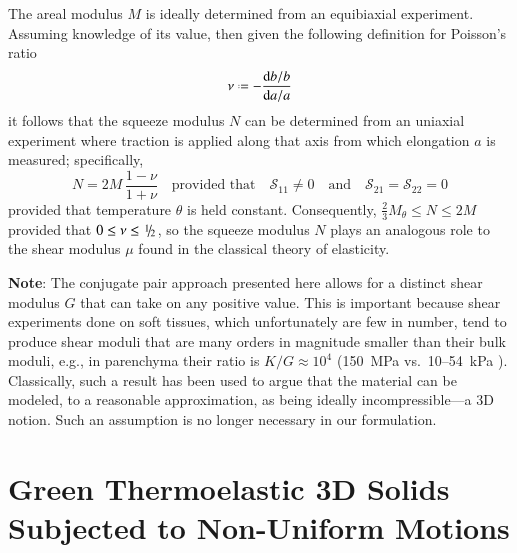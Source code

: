 The areal modulus $M$ is ideally determined from an equibiaxial experiment.  Assuming knowledge of its value, then given the following definition for Poisson's ratio
\begin{displaymath}
\nu \defeq - \frac{\mathrm{d}b / b}{\mathrm{d}a / a}
\end{displaymath}
it follows that the squeeze modulus $N$ can be determined from an uniaxial experiment where traction is applied along that axis from which elongation $a$ is measured; specifically,
\begin{displaymath}
N = 2M \, \frac{1 - \nu}{1 + \nu} 
\quad \text{provided that} \quad
\mathcal{S}_{11} \neq 0 
\quad \text{and} \quad
\mathcal{S}_{21} = \mathcal{S}_{22} = 0 
\end{displaymath}
provided that temperature $\theta$ is held constant.  Consequently, $\tfrac{2}{3} M_{\theta} \leq N \leq 2M$ provided that $0 \leq \nu \leq \textfrac{1}{2}$, so the squeeze modulus $N$ plays an analogous role to the shear modulus $\mu$ found in the classical theory of elasticity.  

\medskip\noindent
\textbf{Note}: 
The conjugate pair approach presented here allows for a distinct shear modulus $G$ that can take on any positive value.  This is important because shear experiments done on soft tissues, which unfortunately are few in number, tend to produce shear moduli that are many orders in magnitude smaller than their bulk moduli, e.g., in parenchyma their ratio is $K/G \approx 10^{4}$ (150~MPa vs.\ 10--54~kPa \cite{Sarafetal07}).  Classically, such a result has been used to argue that the material can be modeled, to a reasonable approximation, as being ideally incompressible---a 3D notion.  Such an assumption is no longer necessary in our formulation.

\section{Green Thermoelastic 3D Solids Subjected to Non-Uniform Motions}
\label{secNonuniform3D}

